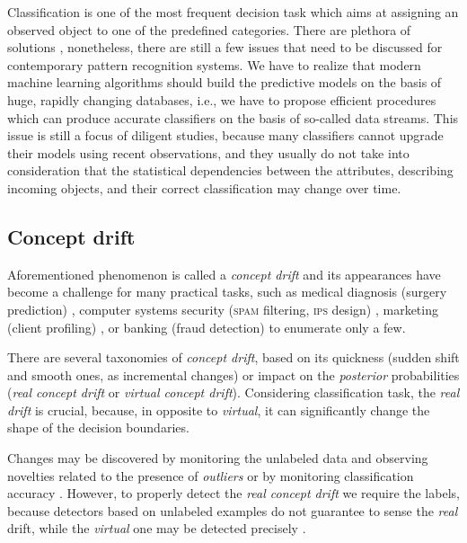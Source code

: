 \noindent Classification is one of the most frequent decision task which aims at assigning an observed object to one of the predefined categories. There are plethora of solutions \cite{Duda:2001}, nonetheless, there are still a few issues that need to be discussed for contemporary pattern recognition systems. We have to realize that modern machine learning algorithms should build the predictive models on the basis of huge, rapidly changing databases, i.e., we have to propose efficient procedures which can produce accurate classifiers on the basis of so-called data streams. This issue is still a focus of diligent studies, because many classifiers cannot upgrade their models using recent observations, and they usually do not take into consideration that the statistical dependencies between the attributes, describing incoming objects, and their correct classification may change over time. 

\subsection{Concept drift}

\noindent Aforementioned phenomenon is called a \emph{concept drift} \cite{Widmer:1996} and its appearances have become a challenge for many practical tasks, such as medical diagnosis (surgery prediction) \cite{Beyene:2015}, computer systems security (\textsc{spam} filtering, \textsc{ips} design) \cite{Lane:1998,Mendez:2006}, marketing (client profiling) \cite{Black:2002}, or banking (fraud detection) \cite{Pozzolo:2015} to enumerate only a few. 

There are several taxonomies of \emph{concept drift}, based on its quickness (sudden shift and smooth ones, as incremental changes) or impact on the \emph{posterior} probabilities \cite{Widmer:1996,Gama:2013} (\emph{real concept drift} or \emph{virtual concept drift}). Considering classification task, the \emph{real drift} is crucial, because, in opposite to \emph{virtual}, it can significantly change the shape of the decision boundaries.

Changes may be discovered by monitoring the unlabeled data and observing novelties related to the presence of \emph{outliers} or by monitoring classification accuracy \cite{Kuncheva:2004,Gama:2013}. However, to properly detect the \emph{real concept drift} we require the labels, because detectors based on unlabeled examples do not guarantee to sense the \emph{real} drift, while the \emph{virtual} one may be detected precisely \cite{Sobolewski:2013}.


